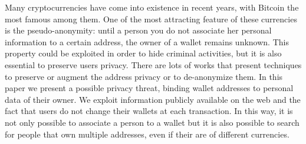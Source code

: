Many cryptocurrencies have come into existence in recent years, with Bitcoin
the most famous among them. One of the most attracting feature of these
currencies is the pseudo-anonymity: until a person you do not associate her
personal information to a certain address, the owner of a wallet remains
unknown. This property could be exploited in order to hide criminal
activities, but it is also essential to preserve users privacy. There are lots
of works that present techniques to preserve or augment the address privacy or
to de-anonymize them. In this paper we present a possible privacy threat,
binding wallet addresses to personal data of their owner. We exploit
information publicly available on the web and the fact that users do not change
their wallets at each transaction. In this way, it is not only possible to
associate a person to a wallet but it is also possible to search for people
that own multiple addresses, even if their are of different currencies.

